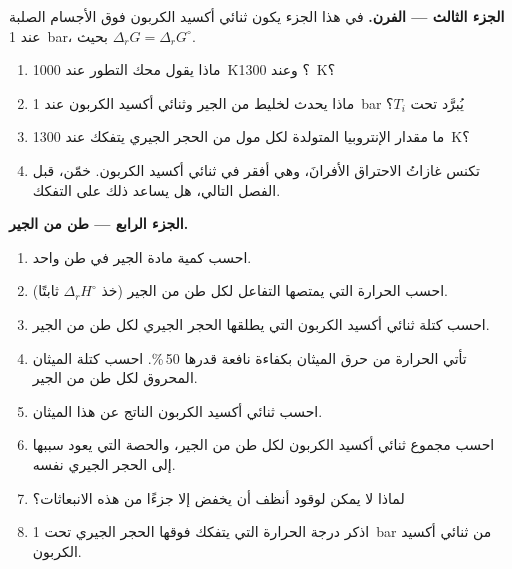 \begin{problem}
\medskip
\noindent\textbf{الجزء الثالث --- الفرن.}
في هذا الجزء يكون ثنائي أكسيد الكربون فوق الأجسام الصلبة عند \qty{1}{bar}،
بحيث $\Delta_r G = \Delta_r G^\circ$.
\begin{enumerate}[resume]
  \item ماذا يقول محك التطور عند \qty{1000}{K}؟ وعند
        \qty{1300}{K}؟
  \item ماذا يحدث لخليط من الجير وثنائي أكسيد الكربون عند
        \qty{1}{bar} يُبرَّد تحت $T_i$؟
  \item ما مقدار الإنتروبيا المتولدة لكل مول من الحجر الجيري يتفكك عند
        \qty{1300}{K}؟
  \item تكنس غازاتُ الاحتراق الأفرانَ، وهي أفقر في ثنائي أكسيد الكربون.
        خمّن، قبل الفصل التالي، هل يساعد ذلك على
        التفكك.
\end{enumerate}

\medskip
\noindent\textbf{الجزء الرابع --- طن من الجير.}
\begin{enumerate}[resume]
  \item احسب كمية مادة الجير في طن واحد.
  \item احسب الحرارة التي يمتصها التفاعل لكل طن من الجير
        (خذ $\Delta_r H^\circ$ ثابتًا).
  \item احسب كتلة ثنائي أكسيد الكربون التي يطلقها الحجر الجيري لكل
        طن من الجير.
  \item تأتي الحرارة من حرق الميثان بكفاءة نافعة قدرها
        50\,\%. احسب كتلة الميثان المحروق لكل طن من الجير.
  \item احسب ثنائي أكسيد الكربون الناتج عن هذا الميثان.
  \item احسب مجموع ثنائي أكسيد الكربون لكل طن من الجير، والحصة التي
        يعود سببها إلى الحجر الجيري نفسه.
  \item لماذا لا يمكن لوقود أنظف أن يخفض إلا جزءًا من هذه الانبعاثات؟
  \item اذكر درجة الحرارة التي يتفكك فوقها الحجر الجيري تحت
        \qty{1}{bar} من ثنائي أكسيد الكربون.
\end{enumerate}
\end{problem}
